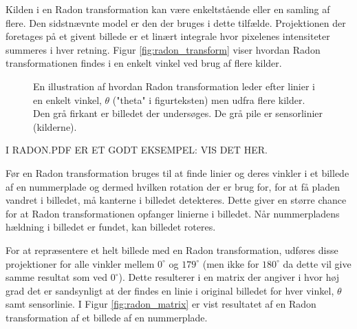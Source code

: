 
Kilden i en Radon transformation kan være enkeltstående eller en samling af flere. Den sidstnævnte model er den der bruges i dette tilfælde. Projektionen der foretages på et givent billede er et linært integrale hvor pixelenes intensiteter summeres i hver retning. Figur \vref{fig:radon_transform} viser hvordan Radon transformationen findes i en enkelt vinkel ved brug af flere kilder.

\begin{figure}[htp]
  \centering
  \caption{En illustration af hvordan Radon transformation leder efter linier i en enkelt vinkel, $\theta$ ("theta" i figurteksten) men udfra flere kilder. Den grå firkant er billedet der undersøges. De grå pile er sensorlinier (kilderne).\cite{matlab_radon}}
  \label{fig:radon_transform}
\end{figure}

I RADON.PDF ER ET GODT EKSEMPEL: VIS DET HER.

Før en Radon transformation bruges til at finde linier og deres vinkler i et billede af en nummerplade og dermed hvilken rotation der er brug for, for at få pladen vandret i billedet, må kanterne i billedet detekteres. Dette giver en større chance for at Radon transformationen opfanger linierne i billedet. Når nummerpladens hældning i billedet er fundet, kan billedet roteres.

For at repræsentere et helt billede med en Radon transformation, udføres disse projektioner for alle vinkler mellem $0^{\circ}$ og $179^{\circ}$ (men ikke for $180^{\circ}$ da dette vil give samme resultat som ved $0^{\circ}$). Dette resulterer i en matrix der angiver i hvor høj grad det er sandsynligt at der findes en linie i original billedet for hver vinkel, $\theta$ samt sensorlinie. I Figur \vref{fig:radon_matrix} er vist resultatet af en Radon transformation af et billede af en nummerplade.

